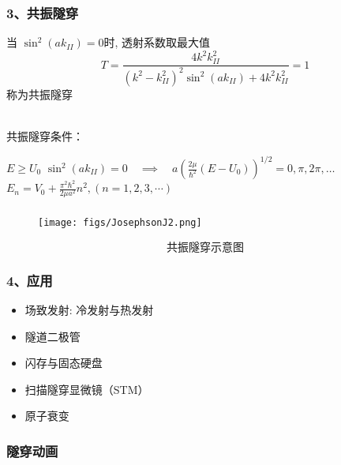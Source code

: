 \begin{frame}
    \frametitle{ 3、共振隧穿}
    当 $\sin ^2 (a k_{II}) =0$时, 透射系数取最大值
    \begin{equation*}
      T=\frac{4 k^2 k_{II}^2}{\left(k^2-k_{II}^2\right)^2 \sin ^2 (a k_{II})+4 k^2 k_{II}^2} =1   
    \end{equation*}
    称为共振隧穿
  
    ~~\\ 
    共振隧穿条件：
    \begin{itemize}
      \Item $E\ge U_0$
      \Item $\sin ^2 (a k_{II}) =0 \quad \implies \quad a\left(\frac{2 \mu}{\hbar^2}\left(E-U_0\right)\right)^{1 / 2}=0, \pi, 2 \pi, \ldots$
      \Item  $E_n = V_0 + \frac{\pi ^2 \hbar^2}{2\mu a^2} n^2, (n=1,2,3,\cdots ) $
    \end{itemize}
  \end{frame} 
  
  \begin{frame}
    \frametitle{}
    \vspace{3em}
  \begin{figure}[htbp]
      \centering
      \texttt{[image: figs/JosephsonJ2.png]}
  \end{figure}
  $$\text{共振隧穿示意图}$$
  \end{frame} 

  \begin{frame}
    \frametitle{4、应用}
    \begin{itemize}
        \item 场致发射: 冷发射与热发射
        \item 隧道二极管 
        \item 闪存与固态硬盘
        \item 扫描隧穿显微镜（STM）
        \item 原子衰变
    \end{itemize}
  \end{frame} 

  \begin{frame}
    \frametitle{隧穿动画}
    \begin{center}
    \end{center} 
  \end{frame} 

